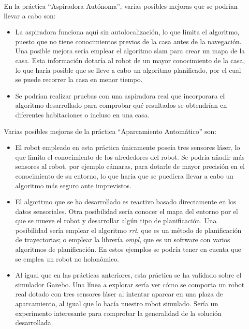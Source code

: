En la práctica ``Aspiradora Autónoma'', varias posibles mejoras que se podrían llevar a cabo son:

\begin{itemize}
\item La aspiradora funciona aquí sin autolocalización, lo que limita el algoritmo, puesto que no tiene conocimientos previos de la casa antes de la navegación. Una posible mejora sería emplear el algoritmo \acrshort{slam} para crear un mapa de la casa. Esta información dotaría al robot de un mayor conocimiento de la casa, lo que haría posible que se lleve a cabo un algoritmo planificado, por el cual se puede recorrer la casa en menor tiempo.
\item Se podrían realizar pruebas con una aspiradora real que incorporara el algoritmo desarrollado para comprobar qué resultados se obtendrían en diferentes habitaciones o incluso en una casa.
\end{itemize}

Varias posibles mejoras de la práctica ``Aparcamiento Automático'' son:

\begin{itemize}
\item El robot empleado en esta práctica únicamente poseía tres sensores láser, lo que limita el conocimiento de los alrededores del robot. Se podría añadir más sensores al robot, por ejemplo cámaras, para dotarle de mayor precisión en el conocimiento de su entorno, lo que haría que se puediera llevar a cabo un algoritmo más seguro ante imprevistos.
\item El algoritmo que se ha desarrollado es reactivo basado directamente en los datos sensoriales. Otra posibilidad sería conocer el mapa del entorno por el que se mueve el robot y desarrollar algún tipo de planificación. Una posibilidad sería emplear el algoritmo \textit{\acrfull{rrt}}, que es un método de planificación de trayectorias; o emplear la librería \textit{\acrfull{ompl}}, que es un software con varios algoritmos de planificación. En estos ejemplos se podría tener en cuenta que se emplea un robot no holonómico.
\item Al igual que en las prácticas anteriores, esta práctica se ha validado sobre el simulador Gazebo. Una línea a explorar sería ver cómo se comporta un robot real dotado con tres sensores láser al intentar aparcar en una plaza de aparcamiento, al igual que lo hacía nuestro robot simulado. Sería un experimento interesante para comprobar la generalidad de la solución desarrollada.
\end{itemize}

